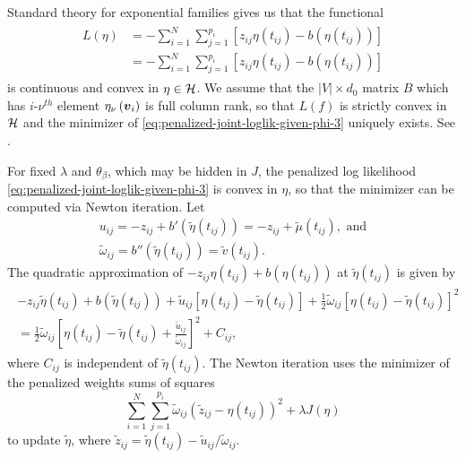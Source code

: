 \bigskip

Standard theory for exponential families gives us that the functional 
\begin{align}
\begin{split}
L\left( \eta \right) &= -\sum_{i=1}^N \sum_{j=1}^{p_i} \left[ z_{ij} \eta\left(t_{ij}\right) - b\left(\eta\left(t_{ij}\right)\right) \right] \\
&= -\sum_{i=1}^N \sum_{j=1}^{p_i} \left[ z_{ij} \eta\left(t_{ij}\right) - b\left(\eta\left(t_{ij}\right)\right) \right]
\end{split} \label{eq:penalized-likelihood-functional}
\end{align}
\noindent
is continuous and convex in $\eta \in \mathcal{H}$. We assume that the $\vert V \vert \times d_0$ matrix $B$ which has $i$-$\nu^{th}$ element $\eta_\nu\left(\mbox{\boldmath $v$}_i\right)$ is full column rank, so that $L\left(f\right)$ is strictly convex in $\mathcal{H}$ and the minimizer of \eqref{eq:penalized-joint-loglik-given-phi-3} uniquely exists. See \cite{wahba1995smoothing}. 

\bigskip

For fixed $\lambda$ and $\theta_\beta$, which may be hidden in $J$, the penalized log likelihood \eqref{eq:penalized-joint-loglik-given-phi-3} is convex in $\eta$, so that the minimizer can be computed via Newton iteration. Let 
\begin{align*}
u_{ij} = -z_{ij} + b'\left( \tilde{\eta}\left(t_{ij}\right) \right) =  -z_{ij} +  \tilde{\mu}\left(t_{ij}\right), \mbox{ and}\\
\tilde{\omega}_{ij} = b''\left( \tilde{\eta}\left(t_{ij}\right) \right) = \tilde{v}\left(t_{ij}\right).
\end{align*}
The quadratic approximation of $-z_{ij} \eta\left(t_{ij}\right) + b\left(\eta\left(t_{ij}\right)\right)$ at $\tilde{\eta}\left(t_{ij}\right)$ is given by 
\begin{align*}
\begin{split}
-z_{ij}\tilde{\eta}\left(t_{ij}\right) + b\left(\tilde{\eta}\left(t_{ij}\right)\right) + \tilde{u}_{ij} \left[  \eta\left(t_{ij}\right) - \tilde{\eta}\left(t_{ij}\right)  \right] + \frac{1}{2} \tilde{\omega}_{ij} \left[ \eta\left(t_{ij}\right) - \tilde{\eta}\left(t_{ij}\right)  \right]^2 \\
 =  \frac{1}{2} \tilde{\omega}_{ij} \left[ \eta\left(t_{ij}\right) - \tilde{\eta}\left(t_{ij}\right) + \frac{\tilde{u}_{ij}}{\tilde{\omega}_{ij}} \right]^2 + C_{ij},
 \end{split}
\end{align*}
\noindent
where $C_{ij}$ is independent of $\tilde{\eta}\left(t_{ij}\right)$.  The Newton iteration uses the minimizer of the penalized weights sums of squares
\begin{equation} \label{eq:penalized-weighted-sums-of-squares}
\sum_{i=1}^N\sum_{j=1}^{p_i} \tilde{\omega}_{ij}\left(\tilde{z}_{ij} - \eta\left(t_{ij}\right)  \right)^2 + \lambda J\left(\eta\right)
\end{equation}
\noindent
to update $\tilde{\eta}$, where $\tilde{z}_{ij} = \tilde{\eta}\left(t_{ij}\right) - \tilde{u}_{ij}/\tilde{\omega}_{ij}$.


